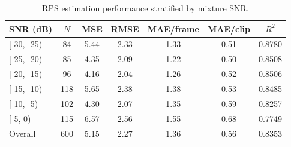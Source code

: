 \begin{table}[htbp]
  \centering
  \caption{RPS estimation performance stratified by mixture SNR.}
  \label{tab:per-snr}
  \begin{tabular}{lcccccc}
    \toprule
    SNR (dB) & $N$ & MSE & RMSE & MAE/frame & MAE/clip & $R^{2}$ \\
    \midrule
    [-30, -25) & 84 & 5.44 & 2.33 & 1.33 & 0.51 & 0.8780 \\
    [-25, -20) & 85 & 4.35 & 2.09 & 1.22 & 0.50 & 0.8508 \\
    [-20, -15) & 96 & 4.16 & 2.04 & 1.26 & 0.52 & 0.8506 \\
    [-15, -10) & 118 & 5.65 & 2.38 & 1.38 & 0.53 & 0.8485 \\
    [-10, -5) & 102 & 4.30 & 2.07 & 1.35 & 0.59 & 0.8257 \\
    [-5, 0) & 115 & 6.57 & 2.56 & 1.55 & 0.68 & 0.7749 \\
    Overall & 600 & 5.15 & 2.27 & 1.36 & 0.56 & 0.8353 \\
    \bottomrule
  \end{tabular}
\end{table}
